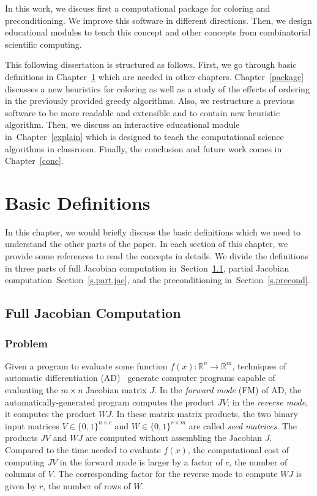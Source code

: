 \documentclass[12pt, oneside]{book}
\newcommand{\secref}[1]{Section~\protect\ref{#1}}
\newcommand{\chapref}[1]{Chapter~\protect\ref{#1}}
\newcommand{\setR}{\ensuremath{\mathbb{R}}}
\newcommand{\col}{\ensuremath{c}}
\newcommand{\row}{\ensuremath{r}}
\begin{document}
In this work, we discuss first a computational package for coloring and preconditioning.
We improve this software in different directions. Then, we design educational modules
to teach this concept and other concepts from combinatorial scientific computing.

This following dissertation is structured as follows.
First, we go through basic definitions in \chapref{prel} which are needed in other chapters.
\chapref{package} discusses a new heuristics for coloring as well as a study of the effects of 
ordering in the previously provided greedy algorithms. Also, we restructure a previous software
to be more readable and extensible and to contain new heuristic algorithm.
Then, we discuss an interactive educational module in~\chapref{explain}
which is designed to teach the computational science algorithms in classroom.
Finally, the conclusion and future work comes in \chapref{conc}.


\chapter{‌Basic Definitions}
\label{prel}

In this chapter, we would briefly discuss the basic definitions which we need to understand
the other parts of the paper. In each section of this chapter, we provide some references to read the concepts
in details. We divide the definitions in three parts of full Jacobian computation in~\secref{s.full.jac},
partial Jacobian computation~\secref{s.part.jac}, and the preconditioning in~\secref{s.precond}.
\section{Full Jacobian Computation}
\label{s.full.jac}
\subsection{Problem}
Given a program to evaluate some function $f(x) : \setR^n \rightarrow \setR^m$,
techniques of automatic differentiation (AD)~\cite{Griewank2008EDP,Rall1981ADT} generate
computer programs capable of evaluating the $m \times n$ Jacobian matrix $J$. In the
\emph{forward mode} (FM) of AD, the automatically-generated program computes the product
$JV$; in the \emph{reverse mode}, it computes the product $WJ$. In these matrix-matrix
products, the two binary input matrices $V \in \{0,1\}^{n\times \col}$ and $W\in
\{0,1\}^{\row\times m}$ are called \emph{seed matrices}. The products $JV$ and $WJ$ are
computed without assembling the Jacobian $J$. Compared to the time needed to evaluate
$f(x)$, the computational cost of computing $JV$ in the forward mode is larger by a
factor of \col, the number of columns of $V$. The corresponding factor for the reverse
mode to compute $WJ$ is given by \row, the number of rows of $W$.
\end{document}
